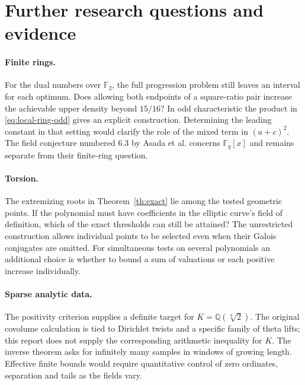 \documentclass[11pt,letterpaper]{article}
\begin{document}
\clearpage
\section{Further research questions and evidence}
\paragraph{Finite rings.}
For the dual numbers over $\mathbb F_2$, the full progression problem
still leaves an interval for each optimum. Does allowing both endpoints
of a square-ratio pair increase the achievable upper density beyond
$15/16$? In odd characteristic the product in \eqref{eq:local-ring-odd}
gives an explicit construction. Determining the leading constant in
that setting would clarify the role of the mixed term in $(a+c)^2$.
The field conjecture numbered 6.3 by Asada et al. concerns
$\mathbb F_q[x]$ and remains separate from their finite-ring question.

\paragraph{Torsion.}
The extremizing roots in Theorem~\ref{th:exact} lie among the tested
geometric points. If the polynomial must have coefficients in the
elliptic curve's field of definition, which of the exact thresholds can
still be attained? The unrestricted construction allows individual
points to be selected even when their Galois conjugates are omitted.
For simultaneous tests on several polynomials an additional choice is
whether to bound a sum of valuations or each positive increase individually.

\paragraph{Sparse analytic data.}
The positivity criterion supplies a definite target for
$K=\mathbb Q(\sqrt[3]{2})$. The original covolume calculation is tied to
Dirichlet twists and a specific family of theta lifts; this report does
not supply the corresponding arithmetic inequality for $K$.
The inverse theorem asks for infinitely many samples in windows of
growing length. Effective finite bounds would require quantitative
control of zero ordinates, separation and tails as the fields vary.
\end{document}
